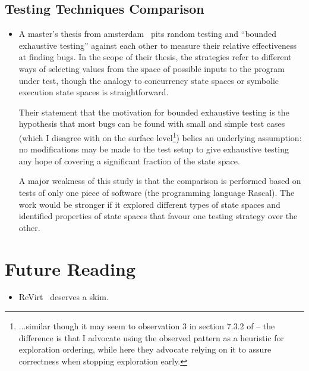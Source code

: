 \documentclass{article}
\begin{document}
\subsection{Testing Techniques Comparison}
\begin{itemize}
	\item A master's thesis from amsterdam~\cite{randomboundedexhaustive} pits random testing and ``bounded exhaustive testing'' against each other to measure their relative effectiveness at finding bugs. In the scope of their thesis, the strategies refer to different ways of selecting values from the space of possible inputs to the program under test, though the analogy to concurrency state spaces or symbolic execution state spaces is straightforward.

		Their statement that the motivation for bounded exhaustive testing is the hypothesis that most bugs can be found with small and simple test cases (which I disagree with on the surface level\footnote{...similar though it may seem to observation 3 in section 7.3.2 of \cite{Landslide} -- the difference is that I advocate using the observed pattern as a heuristic for exploration ordering, while here they advocate relying on it to assure correctness when stopping exploration early.}) belies an underlying assumption: no modifications may be made to the test setup to give exhaustive testing any hope of covering a significant fraction of the state space.

		A major weakness of this study is that the comparison is performed based on tests of only one piece of software (the programming language Rascal). The work would be stronger if it explored different types of state spaces and identified properties of state spaces that favour one testing strategy over the other.
\end{itemize}

\section{Future Reading}
\begin{itemize}
	\item ReVirt~\cite{revirt} deserves a skim.
\end{itemize}

{}

\end{document}
